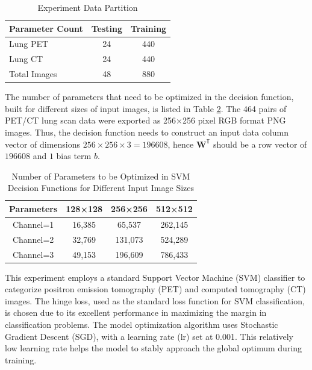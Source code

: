 \documentclass[twocolumn]{article}
\begin{document}
\begin{table}[h]
	\centering
	\caption{Experiment Data Partition}
	\label{tab:dataset_partition_1}
	\begin{tabularx}{\linewidth}{X c c}
		\toprule
		Parameter Count & Testing & Training \\
		\midrule
		Lung PET        & 24      & 440      \\
		Lung CT         & 24      & 440      \\
		Total Images    & 48      & 880      \\
		\bottomrule
	\end{tabularx}
\end{table}

The number of parameters that need to be optimized in the decision function, built for different sizes of input images, is listed in Table \ref{tab:params_count}. The 464 pairs of PET/CT lung scan data were exported as 256×256 pixel RGB format PNG images. Thus, the decision function needs to construct an input data column vector of dimensions $256 \times 256 \times 3 = 196608$, hence $\mathbf{W}^\mathbb{T}$ should be a row vector of $196608$ and $1$ bias term $b$.

\begin{table}[h]
	\centering
	\caption{Number of Parameters to be Optimized in SVM Decision Functions for Different Input Image Sizes}
	\label{tab:params_count}
	\begin{tabular}{cccc}
		\toprule
		Parameters & 128×128 & 256×256 & 512×512 \\
		\midrule
		Channel=1  & 16,385  & 65,537  & 262,145 \\
		Channel=2  & 32,769  & 131,073 & 524,289 \\
		Channel=3  & 49,153  & 196,609 & 786,433 \\
		\bottomrule
	\end{tabular}
\end{table}

This experiment employs a standard Support Vector Machine (SVM) classifier to categorize positron emission tomography (PET) and computed tomography (CT) images. The hinge loss, used as the standard loss function for SVM classification, is chosen due to its excellent performance in maximizing the margin in classification problems. The model optimization algorithm uses Stochastic Gradient Descent (SGD), with a learning rate (lr) set at 0.001. This relatively low learning rate helps the model to stably approach the global optimum during training.
\end{document}
